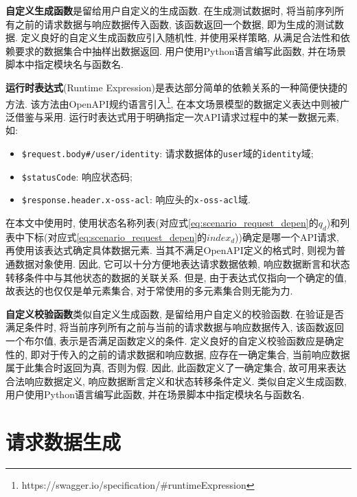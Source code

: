         \textbf{自定义生成函数}是留给用户自定义的生成函数. 在生成测试数据时, 将当前序列所有之前的请求数据与响应数据传入函数, 该函数返回一个数据, 即为生成的测试数据. 定义良好的自定义生成函数应引入随机性, 并使用采样策略, 从满足合法性和依赖要求的数据集合中抽样出数据返回. 用户使用Python语言编写此函数, 并在场景脚本中指定模块名与函数名.
        
        \textbf{运行时表达式}(Runtime Expression)是表达部分简单的依赖关系的一种简便快捷的方法. 该方法由OpenAPI规约语言引入\footnote{https://swagger.io/specification/\#runtimeExpression}, 在本文场景模型的数据定义表达中则被广泛借鉴与采用. 运行时表达式用于明确指定一次API请求过程中的某一数据元素, 如:
        \begin{itemize}
            \item \texttt{\$request.body\#/user/identity}: 请求数据体的\texttt{user}域的\texttt{identity}域;
            
            \item \texttt{\$statusCode}: 响应状态码;
            
            \item \texttt{\$response.header.x-oss-acl}: 响应头的\texttt{x-oss-acl}域.
        \end{itemize}
        在本文中使用时, 使用状态名称列表(对应式\ref{eq:scenario_request_depen}的$q_d$)和列表中下标(对应式\ref{eq:scenario_request_depen}的$index_d$))确定是哪一个API请求, 再使用该表达式确定具体数据元素. 当其不满足OpenAPI定义的格式时, 则视为普通数据对象使用. 因此, 它可以十分方便地表达请求数据依赖, 响应数据断言和状态转移条件中与其他状态的数据的关联关系. 但是, 由于表达式仅指向一个确定的值, 故表达的也仅仅是单元素集合, 对于常使用的多元素集合则无能为力.
        
        \textbf{自定义校验函数}类似自定义生成函数, 是留给用户自定义的校验函数. 在验证是否满足条件时, 将当前序列所有之前与当前的请求数据与响应数据传入, 该函数返回一个布尔值, 表示是否满足函数定义的条件. 定义良好的自定义校验函数应是确定性的, 即对于传入的之前的请求数据和响应数据, 应存在一确定集合, 当前响应数据属于此集合时返回为真, 否则为假. 因此, 此函数定义了一确定集合, 故可用来表达合法响应数据定义, 响应数据断言定义和状态转移条件定义. 类似自定义生成函数, 用户使用Python语言编写此函数, 并在场景脚本中指定模块名与函数名.
        
    \section{请求数据生成}
        \label{sec:req_data_gen}
        
